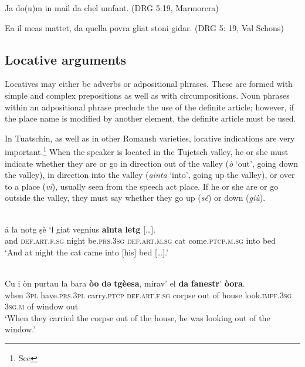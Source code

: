 Ja do(u)m in mail da chel umfant. (DRG 5:19, Marmorera)

Ea il meas mattet, da quella povra gliat stoni gidar. (DRG 5: 19, Val Schons)








\subsection{Locative arguments}
Locatives may either be adverbs or adpositional phrases. These are formed with simple and complex prepositions as well as with circumpositions. Noun phrases within an adpositional phrase preclude the use of the definite article; however, if the place name is modified by another element, the definite article must be used.

In Tuatschin, as well as in other Romansh varieties, locative indications are very important.\footnote{See } When the speaker is located in the Tujetsch valley, he or she must indicate whether they are or go in direction out of the valley (\textit{ò} `out', going down the valley), in direction into the valley (\textit{ainta} `into', going up the valley), or over to a place (\textit{vi}), usually seen from the speech act place. If he or she are or go outside the valley, they must say whether they go up (\textit{sé}) or down (\textit{giù}).

\ea\label{}
\\
\gll å la notg ṣè ‘l giat vegnius \textbf{ainta} \textbf{letg} […].\\
     and \textsc{def.art.f.sg} night be.\textsc{prs.3sg} \textsc{def.art.m.sg} cat come.\textsc{ptcp.m.sg} into bed\\
\glt `And at night the cat came into [his] bed […].'
\z

\ea\label{}
\\
\gll Cu i òn purtau la bara \textbf{òo} \textbf{dǝ} \textbf{tgèesa}, mirav’ el \textbf{da} \textbf{fanestr}’ \textbf{òora}.\\
    when \textsc{3pl} have.\textsc{prs.3pl} carry.\textsc{ptcp} \textsc{def.art.f.sg} corpse out of house
 look.\textsc{impf.3sg} \textsc{3sg.m} of window out\\
\glt `When they carried the corpse out of the house, he was looking out of the window.'
\z

